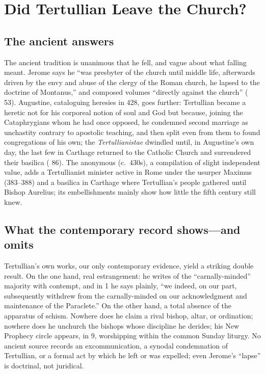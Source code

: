 \section{Did Tertullian Leave the Church?}

\subsection{The ancient answers}

The ancient tradition is unanimous that he fell, and vague about what falling
meant. Jerome says he ``was presbyter of the church until middle life,
afterwards driven by the envy and abuse of the clergy of the Roman church, he
lapsed to the doctrine of Montanus,'' and composed volumes ``directly against
the church'' ( 53). Augustine, cataloguing heresies in
428, goes further: Tertullian became a heretic not for his corporeal notion of
soul and God but because, joining the Cataphrygians whom he had once opposed,
he condemned second marriage as unchastity contrary to apostolic teaching, and
then split even from them to found congregations of his own; the
\textit{Tertullianistae} dwindled until, in Augustine's own day, the last few
in Carthage returned to the Catholic Church and surrendered their basilica
( 86). The anonymous  (c.~430s), a
compilation of slight independent value, adds a Tertullianist minister active
in Rome under the usurper Maximus (383--388) and a basilica in Carthage where
Tertullian's people gathered until Bishop Aurelius; its embellishments mainly
show how little the fifth century still knew.

\subsection{What the contemporary record shows---and omits}

Tertullian's own works, our only contemporary evidence, yield a striking double
result. On the one hand, real estrangement: he writes of the ``carnally-minded''
majority with contempt, and in  1 he says plainly, ``we
indeed, on our part, subsequently withdrew from the carnally-minded on our
acknowledgment and maintenance of the Paraclete.'' On the other hand, a total
absence of the apparatus of schism. Nowhere does he claim a rival bishop,
altar, or ordination; nowhere does he unchurch the bishops whose discipline he
derides; his New Prophecy circle appears, in  9, worshipping
within the common Sunday liturgy. No ancient source records an excommunication,
a synodal condemnation of Tertullian, or a formal act by which he left or was
expelled; even Jerome's ``lapse'' is doctrinal, not juridical.

